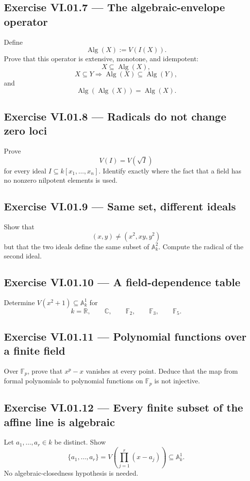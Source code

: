 \subsection*{Exercise VI.01.7 --- The algebraic-envelope operator}
\label{ex:vi01-7}
Define
\[
  \operatorname{Alg}(X):=V(I(X)).
\]
Prove that this operator is extensive, monotone, and idempotent:
\[
  X\subseteq\operatorname{Alg}(X),
\]
\[
  X\subseteq Y\Longrightarrow\operatorname{Alg}(X)\subseteq\operatorname{Alg}(Y),
\]
and
\[
  \operatorname{Alg}(\operatorname{Alg}(X))=\operatorname{Alg}(X).
\]

\subsection*{Exercise VI.01.8 --- Radicals do not change zero loci}
\label{ex:vi01-8}
Prove
\[
  V(I)=V(\sqrt I)
\]
for every ideal \(I\subseteq k[x_1,\dots,x_n]\).  Identify exactly where the fact that a
field has no nonzero nilpotent elements is used.

\subsection*{Exercise VI.01.9 --- Same set, different ideals}
\label{ex:vi01-9}
Show that
\[
  (x,y)\neq(x^2,xy,y^2)
\]
but that the two ideals define the same subset of \(\mathbb A_k^2\).  Compute the radical
of the second ideal.

\subsection*{Exercise VI.01.10 --- A field-dependence table}
\label{ex:vi01-10}
Determine \(V(x^2+1)\subseteq\mathbb A_k^1\) for
\[
  k=\mathbb R,\qquad \mathbb C,\qquad \mathbb F_2,\qquad \mathbb F_3,\qquad \mathbb F_5.
\]

\subsection*{Exercise VI.01.11 --- Polynomial functions over a finite field}
\label{ex:vi01-11}
Over \(\mathbb F_p\), prove that \(x^p-x\) vanishes at every point.  Deduce that the map
from formal polynomials to polynomial functions on \(\mathbb F_p\) is not injective.

\subsection*{Exercise VI.01.12 --- Every finite subset of the affine line is algebraic}
\label{ex:vi01-12}
Let \(a_1,\dots,a_r\in k\) be distinct.  Show
\[
  \{a_1,\dots,a_r\}=V\!\left(\prod_{j=1}^r(x-a_j)\right)
  \subseteq\mathbb A_k^1.
\]
No algebraic-closedness hypothesis is needed.


